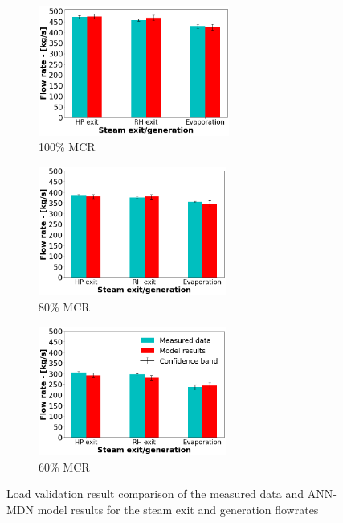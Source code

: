 \documentclass[a4paper,fleqn]{cas-dc}
\begin{document}
\begin{figure}
\centering
\begin{subfigure}{0.33\textwidth}
\includegraphics[width=\linewidth, height = 4.25cm]{100_CASE_STEAM}
        \caption{100\% MCR}
\end{subfigure}\hfill %
\begin{subfigure}{0.33\textwidth}
    \includegraphics[width=\linewidth, height = 4.25cm]{80_CASE_STEAM}
    \caption{80\% MCR}
\end{subfigure}\hfill
\begin{subfigure}{0.33\textwidth}
	\includegraphics[width=\linewidth, height = 4.25cm]{60_CASE_STEAM}
    \caption{60\% MCR}
\end{subfigure}
\caption{Load validation result comparison of the measured data and ANN-MDN model results for the steam exit and generation flowrates}
\label{fig_steam_gen}
\end{figure}
\end{document}
